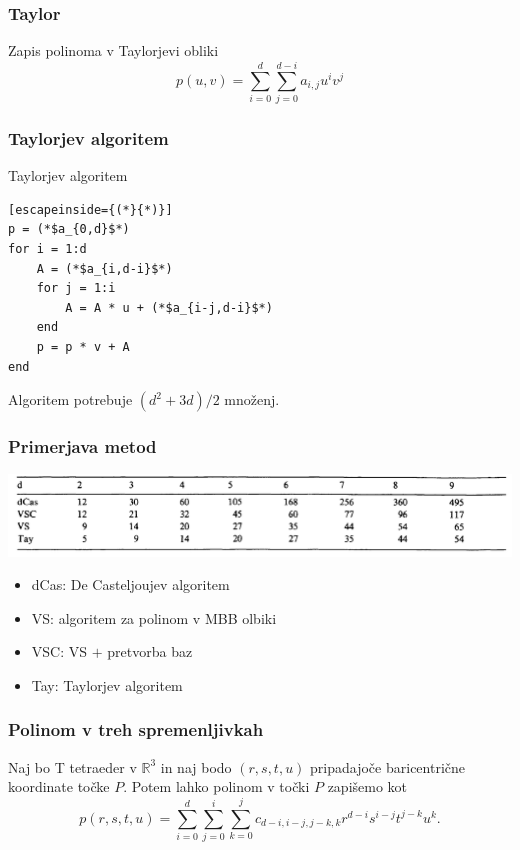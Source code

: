 \documentclass{beamer}
\begin{document}
\begin{frame}
\frametitle{Taylor}
Zapis polinoma v Taylorjevi obliki
$$p(u,v) = \sum_{i = 0}^d{\sum_{j=0}^{d-i}{a_{i,j}u^iv^j }}$$
\end{frame}



\begin{frame}[fragile]
\frametitle{Taylorjev algoritem}

\begin{block}{Taylorjev algoritem}
\begin{lstlisting}[escapeinside={(*}{*)}]
p = (*$a_{0,d}$*)
for i = 1:d
    A = (*$a_{i,d-i}$*)
    for j = 1:i
        A = A * u + (*$a_{i-j,d-i}$*)
    end
    p = p * v + A
end
\end{lstlisting}
\end{block}
Algoritem potrebuje $(d^2+3d)/2$ množenj.

\end{frame}

\begin{frame}
\frametitle{Primerjava metod}

\begin{center}
\includegraphics[width=1.0\linewidth]{tabelca.PNG}
\end{center}

\begin{itemize}
\item dCas: De Casteljoujev algoritem
\item VS: algoritem za polinom v MBB olbiki
\item VSC: VS $+$ pretvorba baz
\item Tay: Taylorjev algoritem
\end{itemize}


\end{frame}

\begin{frame}
\frametitle{Polinom v treh spremenljivkah}
Naj bo T tetraeder v $\mathbb{R}^3$ in naj bodo $(r,s,t,u)$ pripadajoče baricentrične koordinate točke $P$. Potem lahko polinom v točki $P$ zapišemo kot
$$p(r,s,t,u) = \sum_{i=0}^{d}\sum_{j=0}^{i}\sum_{k=0}^{j}c_{d-i,i-j,j-k,k}r^{d-i}s^{i-j}t^{j-k}u^{k}.$$
\end{frame}
\end{document}
